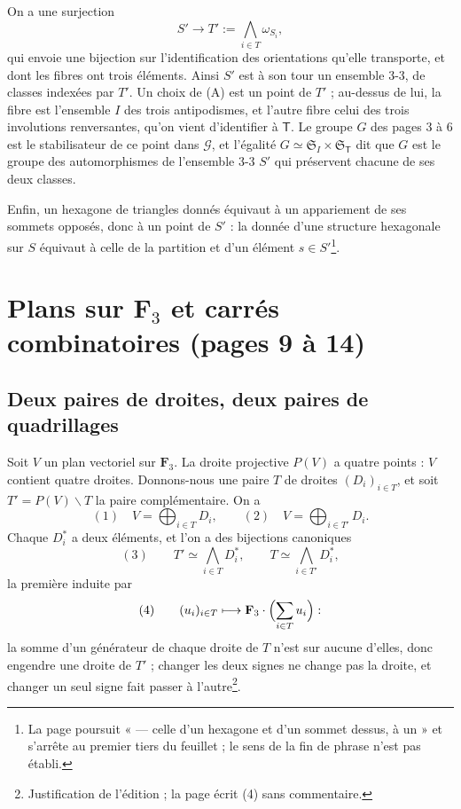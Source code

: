 \documentclass[11pt,a4paper]{article}
\begin{document}
On a une surjection
\[
S' \longrightarrow T' := \bigwedge_{i \in T} \omega_{S_i},
\]
qui envoie une bijection sur l'identification des orientations qu'elle transporte,
et dont les fibres ont trois éléments. Ainsi $S'$ est à son tour un ensemble 3-3,
de classes indexées par $T'$. Un choix de (A) est un point de $T'$ ; au-dessus de
lui, la fibre est l'ensemble $I$ des trois antipodismes, et l'autre fibre celui des
trois involutions renversantes, qu'on vient d'identifier à $\mathsf{T}$. Le groupe $G$
des pages 3 à 6 est le stabilisateur de ce point dans $\mathcal{G}$, et l'égalité
$G \simeq \mathfrak{S}_I \times \mathfrak{S}_{\mathsf{T}}$ dit que $G$ est le groupe des
automorphismes de l'ensemble 3-3 $S'$ qui préservent chacune de ses deux classes.

Enfin, un hexagone de triangles donnés équivaut à un appariement de ses sommets
opposés, donc à un point de $S'$ : la donnée d'une structure hexagonale sur $S$
équivaut à celle de la partition et d'un élément $s \in S'$\footnote{La page
poursuit « — celle d'un hexagone et d'un sommet dessus, à un » et s'arrête au
premier tiers du feuillet ; le sens de la fin de phrase n'est pas établi.}.

\section*{Plans sur $\mathbf{F}_3$ et carrés combinatoires (pages 9 à 14)}

\subsection*{Deux paires de droites, deux paires de quadrillages}

Soit $V$ un plan vectoriel sur $\mathbf{F}_3$. La droite projective $P(V)$ a quatre
points : $V$ contient quatre droites. Donnons-nous une paire $T$ de droites
$(D_i)_{i \in T}$, et soit $T' = P(V) \smallsetminus T$ la paire complémentaire. On a
\[
(1)\quad V = \bigoplus_{i \in T} D_i, \qquad (2)\quad V = \bigoplus_{i \in T'} D_i .
\]
Chaque $D_i^{*}$ a deux éléments, et l'on a des bijections canoniques
\[
(3) \qquad T' \simeq \bigwedge_{i \in T} D_i^{*}, \qquad T \simeq \bigwedge_{i \in T'} D_i^{*},
\]
la première induite par
\[
(4) \qquad (u_i)_{i \in T} \longmapsto \mathbf{F}_3 \cdot \Bigl(\sum_{i \in T} u_i\Bigr) :
\]
la somme d'un générateur de chaque droite de $T$ n'est sur aucune d'elles, donc
engendre une droite de $T'$ ; changer les deux signes ne change pas la droite, et
changer un seul signe fait passer à l'autre\footnote{Justification de l'édition ;
la page écrit (4) sans commentaire.}.
\end{document}
